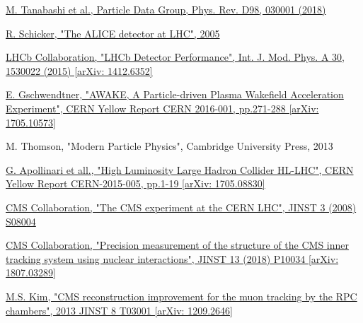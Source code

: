 \documentclass[a4paper, 10pt, openright]{report}
\begin{document}
\begin{thebibliography}{1}
\href{http://pdg.lbl.gov/}{M. Tanabashi et al.,
Particle Data Group,
Phys. Rev. D98, 030001 (2018)}

\href{https://arxiv.org/abs/hep-ph/0509259}{R. Schicker,
"The ALICE detector at LHC",
2005
}

\href{https://arxiv.org/abs/1412.6352}{LHCb Collaboration,
"LHCb Detector Performance",
Int. J. Mod. Phys. A 30, 1530022 (2015) [arXiv: 1412.6352]
}

\href{https://arxiv.org/abs/1705.10573}{E. Gschwendtner,
"AWAKE, A Particle-driven Plasma Wakefield Acceleration Experiment",
CERN Yellow Report CERN 2016-001, pp.271-288 [arXiv: 1705.10573]
}

M. Thomson,
"Modern Particle Physics",
Cambridge University Press, 2013

\href{https://arxiv.org/abs/1705.08830}{G. Apollinari et all.,
"High Luminosity Large Hadron Collider HL-LHC",
CERN Yellow Report CERN-2015-005, pp.1-19 [arXiv: 1705.08830]
}

\href{https://iopscience.iop.org/article/10.1088/1748-0221/3/08/S08004/pdf}{CMS Collaboration,
"The CMS experiment at the CERN LHC",
JINST 3 (2008) S08004
}

\href{https://arxiv.org/abs/1807.03289}{CMS Collaboration,
"Precision measurement of the structure of the CMS inner tracking system using nuclear interactions",
JINST 13 (2018) P10034 [arXiv: 1807.03289]
}

\href{https://arxiv.org/abs/1209.2646}{M.S. Kim,
"CMS reconstruction improvement for the muon tracking by the RPC chambers",
2013 JINST 8 T03001 [arXiv: 1209.2646]}

\end{thebibliography}
\end{document}
